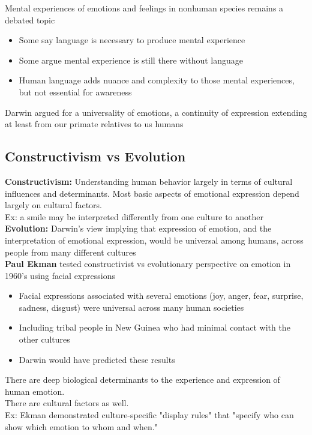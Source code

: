 \documentclass{article}
\begin{document}
Mental experiences of emotions and feelings in nonhuman species remains a debated topic
\begin{itemize}
    \item Some say language is necessary to produce mental experience
    \item Some argue mental experience is still there without language
    \item Human language adds nuance and complexity to those mental experiences, but not essential for awareness
\end{itemize}

Darwin argued for a universality of emotions, a continuity of expression extending at least from our primate relatives to us humans

\subsection{Constructivism vs Evolution}
\textbf{Constructivism:} Understanding human behavior largely in terms of cultural influences and determinants. Most basic aspects of emotional expression depend largely on cultural factors. \\
Ex: a smile may be interpreted differently from one culture to another \\

\noindent \textbf{Evolution:} Darwin's view implying that expression of emotion, and the interpretation of emotional expression, would be universal among humans, across people from many different cultures \\

\noindent \textbf{Paul Ekman} tested constructivist vs evolutionary perspective on emotion in 1960's using facial expressions
\begin{itemize}
    \item Facial expressions associated with several emotions (joy, anger, fear, surprise, sadness, disgust) were universal across many human societies
    \item Including tribal people in New Guinea who had minimal contact with the other cultures
    \item Darwin would have predicted these results
\end{itemize}

\noindent There are deep biological determinants to the experience and expression of human emotion. \\
There are cultural factors as well. \\ 
Ex: Ekman demonstrated culture-specific "display rules" that "specify who can show which emotion to whom and when."
\end{document}
